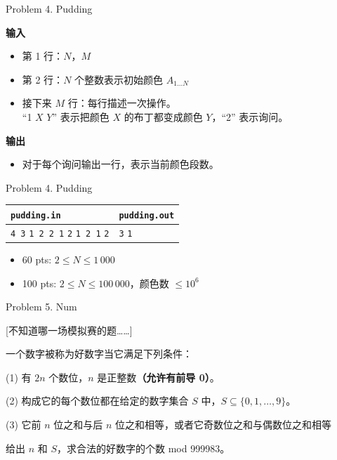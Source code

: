 \documentclass[UTF8]{beamer}
\begin{document}
\begin{frame}{Problem 4. Pudding}

\textbf{输入}
\begin{itemize}
    \item 第 1 行：$N$，$M$
    \item 第 2 行：$N$ 个整数表示初始颜色 $A_{1 \dots N}$
    \item 接下来 $M$ 行：每行描述一次操作。 \\ “1 $X$ $Y$” 表示把颜色 $X$ 的布丁都变成颜色 $Y$，“2” 表示询问。
\end{itemize}
\textbf{输出}
\begin{itemize}
    \item 对于每个询问输出一行，表示当前颜色段数。
\end{itemize}

\end{frame}

\begin{frame}{Problem 4. Pudding}

\begin{tabularx}{\textwidth}{|X|X|}
\hline
\texttt{\textbf{pudding.in}} & \texttt{\textbf{pudding.out}} \\ \hline
\texttt{4 3}\newline
\texttt{1 2 2 1}\newline
\texttt{2}\newline
\texttt{1 2 1}\newline
\texttt{2}
&
\texttt{3}\newline
\texttt{1}
\\ \hline
\end{tabularx}
\newline
\begin{itemize}
    \item 60 pts: $2 \leq N \leq 1\,000$
    \item 100 pts: $2 \leq N \leq 100\,000$，颜色数 $\leq 10^6$
\end{itemize}

\end{frame}


\begin{frame}{Problem 5. Num}

[不知道哪一场模拟赛的题……]

一个数字被称为好数字当它满足下列条件：

(1) 有 $2n$ 个数位，$n$ 是正整数\textbf{（允许有前导 0）}。

(2) 构成它的每个数位都在给定的数字集合 $S$ 中，$S \subseteq \{0,1,\dots,9\}$。

(3) 它前 $n$ 位之和与后 $n$ 位之和相等，或者它奇数位之和与偶数位之和相等

给出 $n$ 和 $S$，求合法的好数字的个数 mod 999983。

\end{frame}
\end{document}
